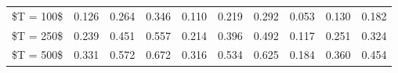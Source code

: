 % 
\begin{tabular}{cccccccccc}
  \hline
  \hline
\$T = 100\$ & 0.126 & 0.264 & 0.346 & 0.110 & 0.219 & 0.292 & 0.053 & 0.130 & 0.182 \\ 
  \$T = 250\$ & 0.239 & 0.451 & 0.557 & 0.214 & 0.396 & 0.492 & 0.117 & 0.251 & 0.324 \\ 
  \$T = 500\$ & 0.331 & 0.572 & 0.672 & 0.316 & 0.534 & 0.625 & 0.184 & 0.360 & 0.454 \\ 
   \hline
\end{tabular}

